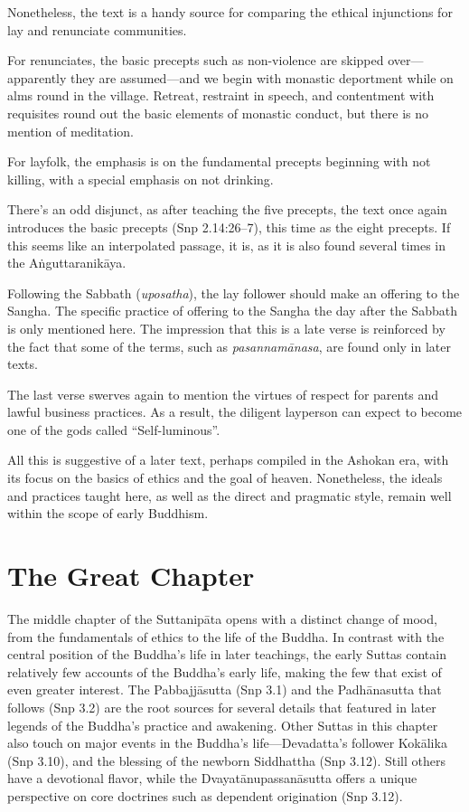 \documentclass[12pt,openany]{book}%
\begin{document}
Nonetheless, the text is a handy source for comparing the ethical injunctions for lay and renunciate communities.

For renunciates, the basic precepts such as non-violence are skipped over—apparently they are assumed—and we begin with monastic deportment while on alms round in the village. Retreat, restraint in speech, and contentment with requisites round out the basic elements of monastic conduct, but there is no mention of meditation.

For layfolk, the emphasis is on the fundamental precepts beginning with not killing, with a special emphasis on not drinking.

There’s an odd disjunct, as after teaching the five precepts, the text once again introduces the basic precepts (Snp 2.14:26–7), this time as the eight precepts. If this seems like an interpolated passage, it is, as it is also found several times in the \textsanskrit{Aṅguttaranikāya}.

Following the Sabbath (\textit{uposatha}), the lay follower should make an offering to the Sangha. The specific practice of offering to the Sangha the day after the Sabbath is only mentioned here. The impression that this is a late verse is reinforced by the fact that some of the terms, such as \textit{\textsanskrit{pasannamānasa}}, are found only in later texts.

The last verse swerves again to mention the virtues of respect for parents and lawful business practices. As a result, the diligent layperson can expect to become one of the gods called “Self-luminous”.

All this is suggestive of a later text, perhaps compiled in the Ashokan era, with its focus on the basics of ethics and the goal of heaven. Nonetheless, the ideals and practices taught here, as well as the direct and pragmatic style, remain well within the scope of early Buddhism.

\section*{The Great Chapter}

The middle chapter of the \textsanskrit{Suttanipāta} opens with a distinct change of mood, from the fundamentals of ethics to the life of the Buddha. In contrast with the central position of the Buddha’s life in later teachings, the early Suttas contain relatively few accounts of the Buddha’s early life, making the few that exist of even greater interest. The \textsanskrit{Pabbajjāsutta} (Snp 3.1) and the \textsanskrit{Padhānasutta} that follows (Snp 3.2) are the root sources for several details that featured in later legends of the Buddha’s practice and awakening. Other Suttas in this chapter also touch on major events in the Buddha’s life—Devadatta’s follower \textsanskrit{Kokālika} (Snp 3.10), and the blessing of the newborn Siddhattha (Snp 3.12). Still others have a devotional flavor, while the \textsanskrit{Dvayatānupassanāsutta} offers a unique perspective on core doctrines such as dependent origination (Snp 3.12).
\end{document}
